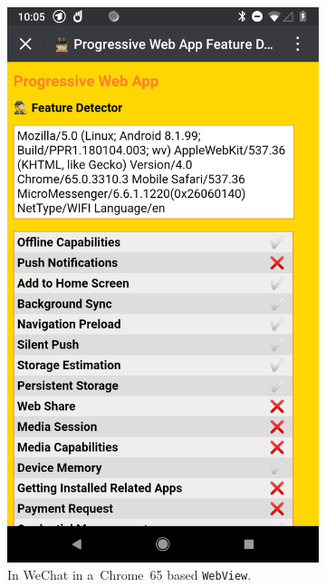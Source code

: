 \documentclass[sigconf]{acmart}
\begin{document}
\begin{figure}[t]
  \centering
  \begin{subfigure}[t]{0.475\columnwidth}
    \includegraphics[width=1\columnwidth,frame]{pwa-feature-detector-wechat-android-chrome65}
    \caption[\textsc{pwa} Feature Detector running in WeChat.]{
      In WeChat in a~Chrome~65 based \texttt{WebView}.}
    \label{fig:wechat-android-chrome65}
  \end{subfigure}    
  \quad
  \begin{subfigure}[t]{0.475\columnwidth}  

\end{subfigure}
\end{figure}
\end{document}
